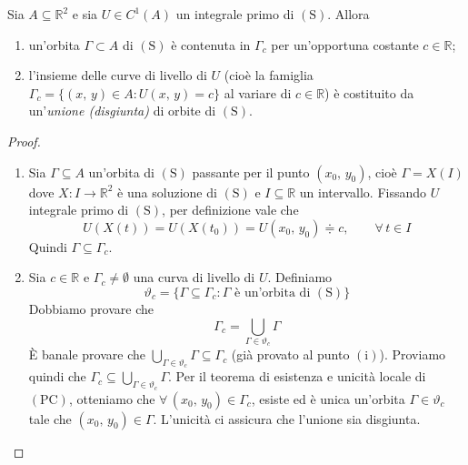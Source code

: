 \begin{thm}
Sia $A \subseteq \mathbb{R}^2$ e sia $U \in C^1(A)$ un integrale primo di $\mathrm{(S)}$. Allora
\begin{enumerate}[labelindent=\parindent,leftmargin=*,label=\textnormal{(\roman*)},start=1]
\item un'orbita $\Gamma \subset A$ di $\mathrm{(S)}$ è contenuta in $\Gamma_c$ per un'opportuna costante $c \in \mathbb{R}$;
\item l'insieme delle curve di livello di $U$ (cioè la famiglia $\Gamma_c = \lbrace (x,\,y) \in A : U(x,\,y) = c \rbrace$ al variare di $c \in \mathbb{R}$) è costituito da un'\emph{unione (disgiunta)} di orbite di $\mathrm{(S)}$.
\end{enumerate}
\end{thm}
\begin{proof}
\mbox{}
\begin{enumerate}[labelindent=\parindent,leftmargin=*,label=\textnormal{(\roman*)},start=1]
\item Sia $\Gamma \subseteq A$ un'orbita di $\mathrm{(S)}$ passante per il punto $(x_0,\,y_0)$, cioè $\Gamma = X(I)$ dove $X : I \longrightarrow \mathbb{R}^2$ è una soluzione di $\mathrm{(S)}$ e $I \subseteq \mathbb{R}$ un intervallo. Fissando $U$ integrale primo di $\mathrm{(S)}$, per definizione vale che
$$
U(X(t)) = U(X(t_0)) = U(x_0,\,y_0) \doteqdot c, \qquad \forall \, t \in I
$$
Quindi $\Gamma \subseteq \Gamma_c$.
\item Sia $c \in \mathbb{R}$ e $\Gamma_c \neq \emptyset$ una curva di livello di $U$. Definiamo
$$
\vartheta_c = \lbrace \Gamma \subseteq \Gamma_c : \Gamma \text{ è un'orbita di } \mathrm{(S)} \rbrace
$$
Dobbiamo provare che
$$
\Gamma_c = \bigcup_{\Gamma \in \vartheta_c} \Gamma
$$
\`{E} banale provare che $\bigcup_{\Gamma \in \vartheta_c} \Gamma \subseteq \Gamma_c$ (già provato al punto $\mathrm{(i)}$). Proviamo quindi che $\Gamma_c \subseteq \bigcup_{\Gamma \in \vartheta_c} \Gamma$. Per il teorema di esistenza e unicità locale di $\mathrm{(PC)}$, otteniamo che $\forall \, (x_0,\,y_0) \in \Gamma_c$, esiste ed è unica un'orbita $\Gamma \in \vartheta_c$ tale che $(x_0,\,y_0) \in \Gamma$. L'unicità ci assicura che l'unione sia disgiunta.
\end{enumerate}
\end{proof}

